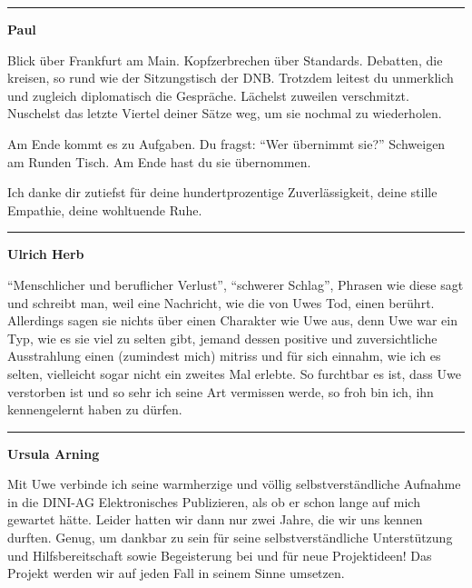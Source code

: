\documentclass[a4paper,
fontsize=11pt,
oneside,
numbers=noperiodatend,
parskip=half-,
bibliography=totoc,
final
]{scrartcl}
\begin{document}
\begin{center}\rule{0.5\linewidth}{0.5pt}\end{center}

\textbf{Paul}

Blick über Frankfurt am Main. Kopfzerbrechen über Standards. Debatten,
die kreisen, so rund wie der Sitzungstisch der DNB. Trotzdem leitest du
unmerklich und zugleich diplomatisch die Gespräche. Lächelst zuweilen
verschmitzt. Nuschelst das letzte Viertel deiner Sätze weg, um sie
nochmal zu wiederholen.

Am Ende kommt es zu Aufgaben. Du fragst: \enquote{Wer übernimmt sie?}
Schweigen am Runden Tisch. Am Ende hast du sie übernommen.

Ich danke dir zutiefst für deine hundertprozentige Zuverlässigkeit,
deine stille Empathie, deine wohltuende Ruhe.

\begin{center}\rule{0.5\linewidth}{0.5pt}\end{center}

\textbf{Ulrich Herb}

\enquote{Menschlicher und beruflicher Verlust}, \enquote{schwerer
Schlag}, Phrasen wie diese sagt und schreibt man, weil eine Nachricht,
wie die von Uwes Tod, einen berührt. Allerdings sagen sie nichts über
einen Charakter wie Uwe aus, denn Uwe war ein Typ, wie es sie viel zu
selten gibt, jemand dessen positive und zuversichtliche Ausstrahlung
einen (zumindest mich) mitriss und für sich einnahm, wie ich es selten,
vielleicht sogar nicht ein zweites Mal erlebte. So furchtbar es ist,
dass Uwe verstorben ist und so sehr ich seine Art vermissen werde, so
froh bin ich, ihn kennengelernt haben zu dürfen.

\begin{center}\rule{0.5\linewidth}{0.5pt}\end{center}

\textbf{Ursula Arning}

Mit Uwe verbinde ich seine warmherzige und völlig selbstverständliche
Aufnahme in die DINI-AG Elektronisches Publizieren, als ob er schon
lange auf mich gewartet hätte. Leider hatten wir dann nur zwei Jahre,
die wir uns kennen durften. Genug, um dankbar zu sein für seine
selbstverständliche Unterstützung und Hilfsbereitschaft sowie
Begeisterung bei und für neue Projektideen! Das Projekt werden wir auf
jeden Fall in seinem Sinne umsetzen.

\end{document}
